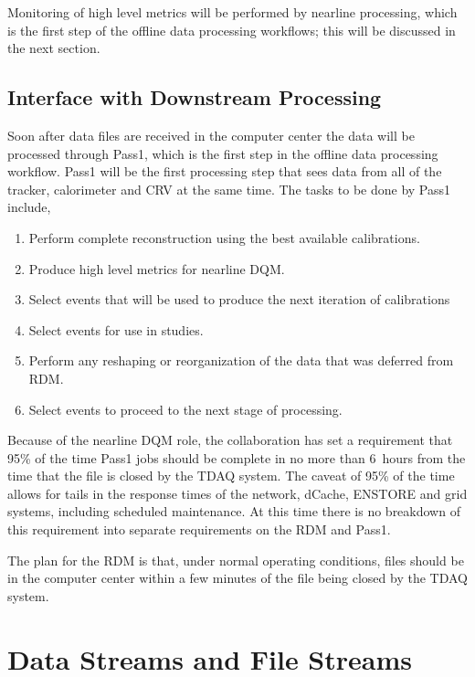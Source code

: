 Monitoring of high level metrics will be performed by nearline processing,
which is the first step of the offline data processing workflows;
this will be discussed in the next section.

\section{Interface with Downstream Processing}
\label{sec:downstreamProcessing}

Soon after data files are received in the computer center the data will be processed
through Pass1, which is the first step in the offline data processing workflow.
Pass1 will be the first processing step that sees data from all of the tracker,
calorimeter and CRV at the same time.  The tasks to be done by Pass1 include,
\begin{enumerate}
  \item Perform complete reconstruction using the best available calibrations.
  \item Produce high level metrics for nearline DQM.
  \item Select events that will be used to produce the next iteration of calibrations
  \item Select events for use in studies.
  \item Perform any reshaping or reorganization of the data that was deferred from RDM.
  \item Select events to proceed to the next stage of processing. 
\end{enumerate}

Because of the nearline DQM role, the collaboration has set a requirement that
95\% of the time Pass1 jobs should be complete in no more than 6~hours from the
time that the file is closed by the TDAQ system.
The caveat of 95\% of the time allows for tails in the response times of
the network, dCache, ENSTORE and grid systems, including scheduled maintenance.
At this time there is no breakdown of this requirement into separate requirements
on the RDM and Pass1.

The plan for the RDM is that, under normal operating conditions,
files should be in the computer center within a few minutes of the file being closed
by the TDAQ system.



\chapter{Data Streams and File Streams}
\label{ch:DataStreamsAndFileStreams}

